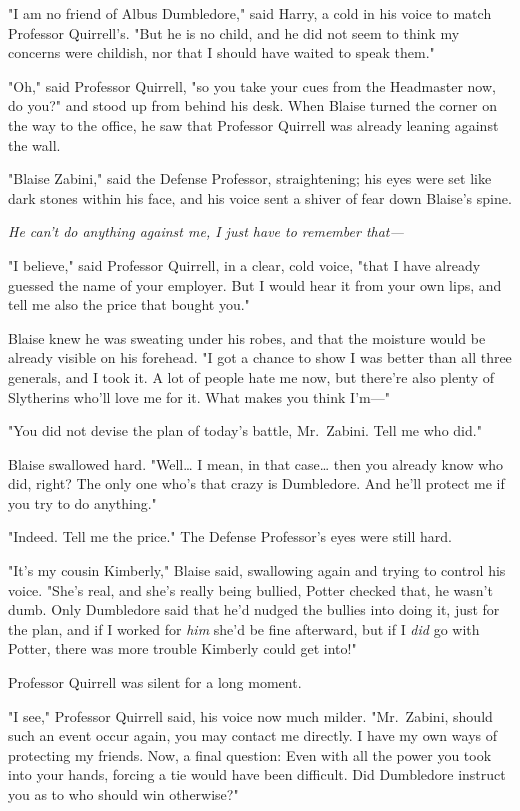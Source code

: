 "I am no friend of Albus Dumbledore," said Harry, a cold in his voice to match 
Professor Quirrell's. "But he is no child, and he did not seem to think my 
concerns were childish, nor that I should have waited to speak them."

"Oh," said Professor Quirrell, "so you take your cues from the Headmaster now, 
do you?" and stood up from behind his desk.
\sbreak
When Blaise turned the corner on the way to the office, he saw that Professor 
Quirrell was already leaning against the wall.

"Blaise Zabini," said the Defense Professor, straightening; his eyes were set 
like dark stones within his face, and his voice sent a shiver of fear down 
Blaise's spine.

\emph{He can't do anything against me, I just have to remember that---}

"I believe," said Professor Quirrell, in a clear, cold voice, "that I have 
already guessed the name of your employer. But I would hear it from your own 
lips, and tell me also the price that bought you."

Blaise knew he was sweating under his robes, and that the moisture would be 
already visible on his forehead. "I got a chance to show I was better than all 
three generals, and I took it. A lot of people hate me now, but there're also 
plenty of Slytherins who'll love me for it. What makes you think I'm---"

"You did not devise the plan of today's battle, Mr.~Zabini. Tell me who did."

Blaise swallowed hard. "Well{\ldots} I mean, in that case{\ldots} then you 
already know who did, right? The only one who's that crazy is Dumbledore. And 
he'll protect me if you try to do anything."

"Indeed. Tell me the price." The Defense Professor's eyes were still hard.

"It's my cousin Kimberly," Blaise said, swallowing again and trying to control 
his voice. "She's real, and she's really being bullied, Potter checked that, he 
wasn't dumb. Only Dumbledore said that he'd nudged the bullies into doing it, 
just for the plan, and if I worked for \emph{him} she'd be fine afterward, but 
if I \emph{did} go with Potter, there was more trouble Kimberly could get into!"

Professor Quirrell was silent for a long moment.

"I see," Professor Quirrell said, his voice now much milder. "Mr.~Zabini, 
should such an event occur again, you may contact me directly. I have my own 
ways of protecting my friends. Now, a final question: Even with all the power 
you took into your hands, forcing a tie would have been difficult. Did 
Dumbledore instruct you as to who should win otherwise?"

